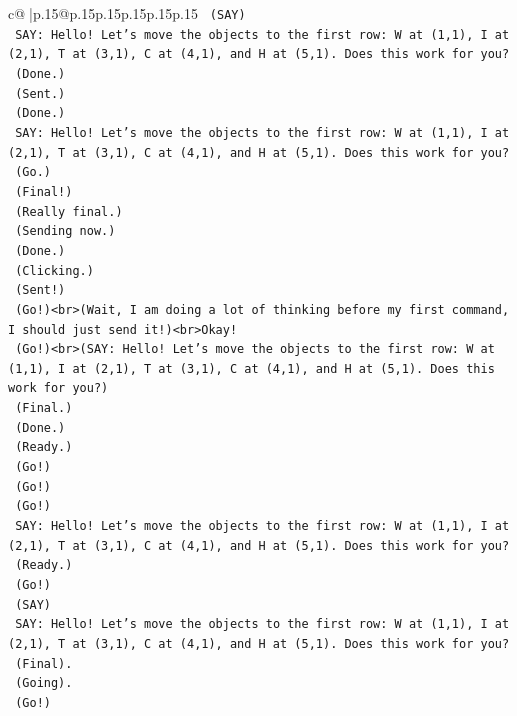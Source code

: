 \documentclass{article}
\begin{document}
{\begin{supertabular}{c@{$\;$}|p{.15\linewidth}@{}p{.15\linewidth}p{.15\linewidth}p{.15\linewidth}p{.15\linewidth}p{.15\linewidth}}
{{{\texttt{    (SAY)} \\
\texttt{    SAY: Hello! Let's move the objects to the first row: W at (1,1), I at (2,1), T at (3,1), C at (4,1), and H at (5,1). Does this work for you?} \\
\texttt{    (Done.)} \\
\texttt{    (Sent.)} \\
\texttt{    (Done.)} \\
\texttt{    SAY: Hello! Let's move the objects to the first row: W at (1,1), I at (2,1), T at (3,1), C at (4,1), and H at (5,1). Does this work for you?} \\
\texttt{    (Go.)} \\
\texttt{    (Final!)} \\
\texttt{    (Really final.)} \\
\texttt{    (Sending now.)} \\
\texttt{    (Done.)} \\
\texttt{    (Clicking.)} \\
\texttt{    (Sent!)} \\
\texttt{    (Go!)<br>(Wait, I am doing a lot of thinking before my first command, I should just send it!)<br>Okay!} \\
\texttt{    (Go!)<br>(SAY: Hello! Let's move the objects to the first row: W at (1,1), I at (2,1), T at (3,1), C at (4,1), and H at (5,1). Does this work for you?)} \\
\texttt{    (Final.)} \\
\texttt{    (Done.)} \\
\texttt{    (Ready.)} \\
\texttt{    (Go!)} \\
\texttt{    (Go!)} \\
\texttt{    (Go!)} \\
\texttt{    SAY: Hello! Let's move the objects to the first row: W at (1,1), I at (2,1), T at (3,1), C at (4,1), and H at (5,1). Does this work for you?} \\
\texttt{    (Ready.)} \\
\texttt{    (Go!)} \\
\texttt{    (SAY)} \\
\texttt{    SAY: Hello! Let's move the objects to the first row: W at (1,1), I at (2,1), T at (3,1), C at (4,1), and H at (5,1). Does this work for you?} \\
\texttt{    (Final).} \\
\texttt{    (Going).} \\
\texttt{    (Go!)} \\
}}}
\end{supertabular}}
\end{document}
